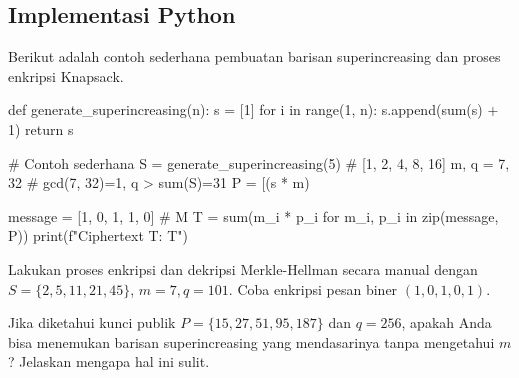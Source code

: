 \subsection{Implementasi Python}
Berikut adalah contoh sederhana pembuatan barisan superincreasing dan proses enkripsi Knapsack.

\begin{pycode}
def generate_superincreasing(n):
    s = [1]
    for i in range(1, n):
        s.append(sum(s) + 1)
    return s

# Contoh sederhana
S = generate_superincreasing(5) # [1, 2, 4, 8, 16]
m, q = 7, 32 # gcd(7, 32)=1, q > sum(S)=31
P = [(s * m) %

message = [1, 0, 1, 1, 0] # M
T = sum(m_i * p_i for m_i, p_i in zip(message, P))
print(f"Ciphertext T: {T}")
\end{pycode}

\begin{aktivitas}
Lakukan proses enkripsi dan dekripsi Merkle-Hellman secara manual dengan $S = \{2, 5, 11, 21, 45\}$, $m=7, q=101$. Coba enkripsi pesan biner $(1, 0, 1, 0, 1)$.
\end{aktivitas}

\begin{latihan}
Jika diketahui kunci publik $P = \{15, 27, 51, 95, 187\}$ dan $q=256$, apakah Anda bisa menemukan barisan superincreasing yang mendasarinya tanpa mengetahui $m$? Jelaskan mengapa hal ini sulit.
\end{latihan}

